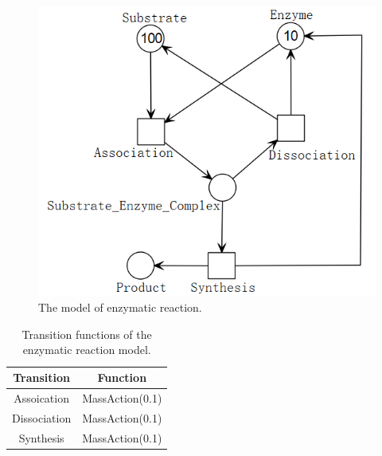 \documentclass[journal,a4paper,onecolumn]{article}
\begin{document}
\begin{figure}[!hbt]
	\begin{center}
		\includegraphics[width=0.8\columnwidth]{fig25}
		\caption{The model of enzymatic reaction.}
		\label{fig:The model of enzyme}
	\end{center}
\end{figure}

\begin{table}[!hbt]
	\begin{center}
		\caption{Transition functions of the enzymatic reaction model.}
		\label{Transition functions of enzyme}
		\begin{tabular}{|c|c|}
			\hline
			Transition&Function\\
			\hline
			Assoication&MassAction(0.1)\\
			\hline
			Dissociation&MassAction(0.1)\\
			\hline
			Synthesis&MassAction(0.1)\\
			\hline
		\end{tabular}
	\end{center}
\end{table}
\end{document}
